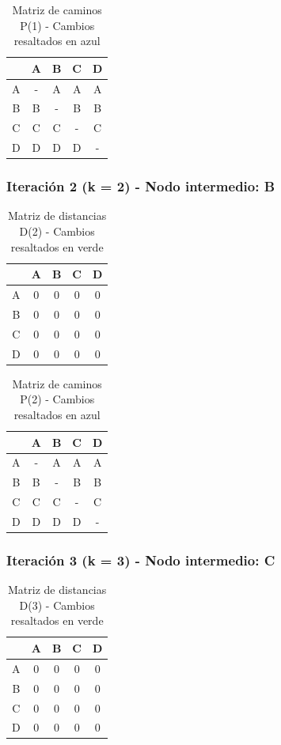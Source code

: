 \documentclass[12pt]{article}
\begin{document}
\begin{table}[h!]
\centering
\begin{tabular}{|c|c|c|c|c|}
\hline
 & A & B & C & D \\\hline
A & - & A & A & A \\\hline
B & B & - & B & B \\\hline
C & C & C & - & C \\\hline
D & D & D & D & - \\\hline
\end{tabular}
\caption{Matriz de caminos P(1) - Cambios resaltados en azul}
\end{table}

\clearpage
\subsubsection{Iteración 2 (k = 2) - Nodo intermedio: B}
\begin{table}[h!]
\centering
\begin{tabular}{|c|c|c|c|c|}
\hline
 & A & B & C & D \\\hline
A & 0 & 0 & 0 & 0 \\\hline
B & 0 & 0 & 0 & 0 \\\hline
C & 0 & 0 & 0 & 0 \\\hline
D & 0 & 0 & 0 & 0 \\\hline
\end{tabular}
\caption{Matriz de distancias D(2) - Cambios resaltados en verde}
\end{table}

\begin{table}[h!]
\centering
\begin{tabular}{|c|c|c|c|c|}
\hline
 & A & B & C & D \\\hline
A & - & A & A & A \\\hline
B & B & - & B & B \\\hline
C & C & C & - & C \\\hline
D & D & D & D & - \\\hline
\end{tabular}
\caption{Matriz de caminos P(2) - Cambios resaltados en azul}
\end{table}

\clearpage
\subsubsection{Iteración 3 (k = 3) - Nodo intermedio: C}
\begin{table}[h!]
\centering
\begin{tabular}{|c|c|c|c|c|}
\hline
 & A & B & C & D \\\hline
A & 0 & 0 & 0 & 0 \\\hline
B & 0 & 0 & 0 & 0 \\\hline
C & 0 & 0 & 0 & 0 \\\hline
D & 0 & 0 & 0 & 0 \\\hline
\end{tabular}
\caption{Matriz de distancias D(3) - Cambios resaltados en verde}
\end{table}
\end{document}
